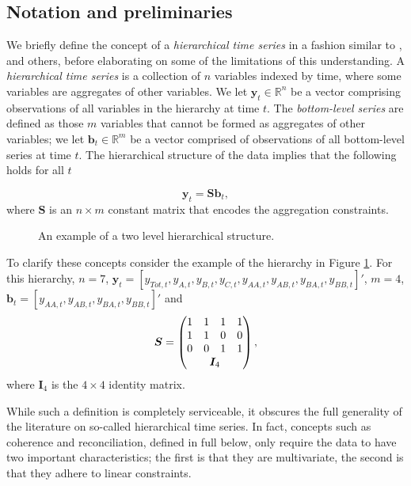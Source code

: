 \documentclass[12pt]{article}
\theoremstyle{definition}
\begin{document}
	\subsection{Notation and preliminaries}\label{sec:notation}
	
    We briefly define the concept of a \emph{hierarchical time series} in a fashion similar to \cite{AthEtAl2019_MacroBook}, \cite{FPP2018} and others, before elaborating on some of the limitations of this understanding.  A \emph{hierarchical time series} is a collection of $n$ variables indexed by time, where some variables are aggregates of other variables. We let $\bm{y}_t \in \mathbb{R}^n$ be a vector comprising observations of all variables in the hierarchy at time $t$. The \emph{bottom-level series} are defined as those $m$ variables that cannot be formed as aggregates of other variables; we let $\bm{b}_t \in \mathbb{R}^m$ be a vector comprised of observations of all bottom-level series at time $t$.  The hierarchical structure of the data implies that the following holds for all $t$

    \begin{equation*}
    \bm{y}_t = \bm{Sb}_t,
    \end{equation*}
    where $\bm{S}$ is an $n \times m$ constant matrix that encodes the aggregation constraints.
	
		\begin{figure}[H]
			\begin{center}
				 
				 
				\qobitree
			\end{center}
			\caption{An example of a two level hierarchical structure.}\label{fig:basichier}
		\end{figure}
	
	To clarify these concepts consider the example of the hierarchy in Figure \ref{fig:basichier}.  For this hierarchy, $n=7$, $\bm{y}_t = [y_{Tot,t},y_{A,t}, y_{B,t},y_{C,t},y_{AA,t}, y_{AB,t}, y_{BA,t}, y_{BB,t}]'$, $m=4$, $\bm{b}_t = [y_{AA,t}, y_{AB,t}, y_{BA,t}, y_{BB,t}]'$ and
	\[
	\bm{S} = \begin{pmatrix}
	1 & 1 & 1 & 1  \\
	1 & 1 & 0 & 0 \\
	0 & 0 & 1 & 1 \\
	& \multicolumn{2}{c}{\bm{I}_4} &
	\end{pmatrix},
	\]
	where $\bm{I}_4$ is the $4\times 4$ identity matrix.
	
	While such a definition is completely serviceable, it obscures the full generality of the literature on so-called hierarchical time series.  In fact, concepts such as coherence and reconciliation, defined in full below, only require the data to have two important characteristics; the first is that they are multivariate, the second is that they adhere to linear constraints.
	
\end{document}
